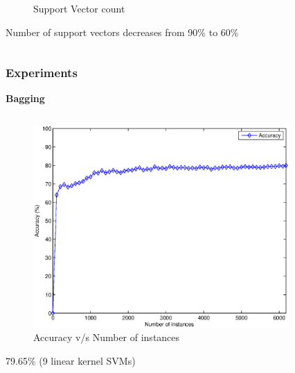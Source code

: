 \documentclass{beamer}
\begin{document}
\begin{frame}
\begin{columns}
\begin{column}{0.5\textwidth}
\begin{figure}
                    \caption{Support Vector count}
                \end{figure}
                \begin{center}
                    \small Number of support vectors decreases from 90\% to 60\%
                \end{center}
            \end{column}
        \end{columns}
    \end{frame}
    
    \begin{frame}
        \frametitle{Experiments}
        \begin{center}
            \textbf{Bagging}
        \end{center}
        \begin{columns}
            \begin{column}{0.5\textwidth}
                \begin{figure}
                    \centering
                    \includegraphics[width=\textwidth]{figures/bagging_accuracy.eps}
                    \caption{Accuracy v/s Number of instances}
                \end{figure}
                \begin{center}
                    \small 79.65\% (9 linear kernel SVMs)
                \end{center}
            \end{column}
            \begin{column}{0.5\textwidth}
                \begin{figure}

\end{figure}
\end{column}
\end{columns}
\end{frame}
\end{document}
